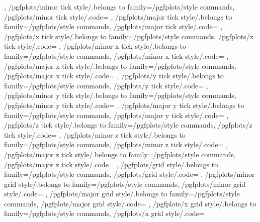{{		%
	},
	/pgfplots/minor tick style/.belongs to family=/pgfplots/style commands,
	/pgfplots/minor tick style/.code={%
	},
	/pgfplots/major tick style/.belongs to family=/pgfplots/style commands,
	/pgfplots/major tick style/.code={%
	},
	/pgfplots/x tick style/.belongs to family=/pgfplots/style commands,
	/pgfplots/x tick style/.code={%
	},
	/pgfplots/minor x tick style/.belongs to family=/pgfplots/style commands,
	/pgfplots/minor x tick style/.code={%
	},
	/pgfplots/major x tick style/.belongs to family=/pgfplots/style commands,
	/pgfplots/major x tick style/.code={%
	},
	/pgfplots/y tick style/.belongs to family=/pgfplots/style commands,
	/pgfplots/y tick style/.code={%
	},
	/pgfplots/minor y tick style/.belongs to family=/pgfplots/style commands,
	/pgfplots/minor y tick style/.code={%
	},
	/pgfplots/major y tick style/.belongs to family=/pgfplots/style commands,
	/pgfplots/major y tick style/.code={%
	},
	/pgfplots/z tick style/.belongs to family=/pgfplots/style commands,
	/pgfplots/z tick style/.code={%
	},
	/pgfplots/minor z tick style/.belongs to family=/pgfplots/style commands,
	/pgfplots/minor z tick style/.code={%
	},
	/pgfplots/major z tick style/.belongs to family=/pgfplots/style commands,
	/pgfplots/major z tick style/.code={%
	},
	/pgfplots/grid style/.belongs to family=/pgfplots/style commands,
	/pgfplots/grid style/.code={%
	},
	/pgfplots/minor grid style/.belongs to family=/pgfplots/style commands,
	/pgfplots/minor grid style/.code={%
	},
	/pgfplots/major grid style/.belongs to family=/pgfplots/style commands,
	/pgfplots/major grid style/.code={%
	},
	/pgfplots/x grid style/.belongs to family=/pgfplots/style commands,
	/pgfplots/x grid style/.code={%
}}
